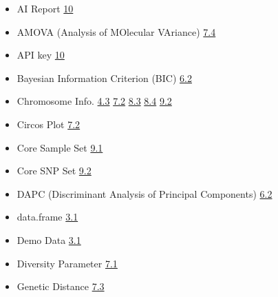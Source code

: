\documentclass[
]{book}
\begin{document}
\begin{itemize}
\item
  AI Report \href{https://teddyenn.github.io/ShiNyP-guide/sec-ai-report.html\#sec-ai-report}{10}
\item
  AMOVA (Analysis of MOlecular VAriance) \href{https://teddyenn.github.io/ShiNyP-guide/sec-genetic-diversity.html\#amova-analysis-of-molecular-variance}{7.4}
\item
  API key \href{https://teddyenn.github.io/ShiNyP-guide/sec-ai-report.html\#step-2-ai-driven-report}{10}
\item
  Bayesian Information Criterion (BIC) \href{https://teddyenn.github.io/ShiNyP-guide/sec-population-structure.html\#step-2-dapc-analysis}{6.2}
\item
  Chromosome Info. \href{https://teddyenn.github.io/ShiNyP-guide/sec-data-qc.html\#snp-density}{4.3} \href{https://teddyenn.github.io/ShiNyP-guide/sec-genetic-diversity.html\#circos-plot}{7.2} \href{https://teddyenn.github.io/ShiNyP-guide/sec-selection-sweep.html\#ibs-identity-by-state}{8.3} \href{https://teddyenn.github.io/ShiNyP-guide/sec-selection-sweep.html\#manhattan-plot-plus}{8.4} \href{https://teddyenn.github.io/ShiNyP-guide/sec-core-collection.html\#core-snp-set}{9.2}
\item
  Circos Plot \href{https://teddyenn.github.io/ShiNyP-guide/sec-genetic-diversity.html\#circos-plot}{7.2}
\item
  Core Sample Set \href{https://teddyenn.github.io/ShiNyP-guide/sec-core-collection.html\#core-sample-set}{9.1}
\item
  Core SNP Set \href{https://teddyenn.github.io/ShiNyP-guide/sec-core-collection.html\#core-snp-set}{9.2}
\item
  DAPC (Discriminant Analysis of Principal Components) \href{https://teddyenn.github.io/ShiNyP-guide/sec-population-structure.html\#dapc-discriminant-analysis-of-principal-components}{6.2}
\item
  data.frame \href{https://teddyenn.github.io/ShiNyP-guide/sec-data-input.html\#step-2-transform-to-data.frame}{3.1}
\item
  Demo Data \href{https://teddyenn.github.io/ShiNyP-guide/sec-data-input.html\#step-1-input-your-vcf-file}{3.1}
\item
  Diversity Parameter \href{https://teddyenn.github.io/ShiNyP-guide/sec-genetic-diversity.html\#diversity-parameter}{7.1}
\item
  Genetic Distance \href{https://teddyenn.github.io/ShiNyP-guide/sec-genetic-diversity.html\#genetic-distance}{7.3}

\end{itemize}
\end{document}
